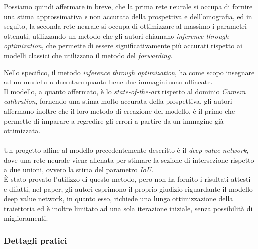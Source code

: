 \documentclass{article}
\begin{document}
Possiamo quindi affermare in breve, che la prima rete neurale si occupa di fornire una stima approssimativa e non accurata della prospettiva e dell'omografia, ed in seguito, la seconda rete neurale si occupa di ottimizzare al massimo i parametri ottenuti, utilizzando un metodo che gli autori chiamano \textit{inference through optimization}, che permette di essere significativamente più accurati rispetto ai modelli classici che utilizzano il metodo del \textit{forwarding}.

Nello specifico, il metodo \textit{inference through optimization}, ha come scopo insegnare ad un modello a decretare quanto bene due immagini sono allineate. 
\\Il modello, a quanto affermato, è lo \textit{state-of-the-art} rispetto al dominio \textit{Camera calibration}, fornendo una stima molto accurata della prospettiva, gli autori affermano inoltre che il loro metodo di creazione del modello, è il primo che permette di imparare a regredire gli errori a partire da un immagine già ottimizzata.
\\\\
Un progetto affine al modello precedentemente descritto è il \textit{deep value network}, dove una rete neurale viene allenata per stimare la sezione di intersezione rispetto a due unioni, ovvero la stima del parametro \textit{IoU}.
\\È stato provato l'utilizzo di questo metodo, pero non ha fornito i risultati attesti e difatti, nel paper, gli autori esprimono il proprio giudizio riguardante il modello deep value network, in quanto esso, richiede una lunga ottimizzazione della traiettoria ed è inoltre limitato ad una sola iterazione iniziale, senza possibilità di miglioramenti.

\subsubsection{Dettagli pratici}
\end{document}
